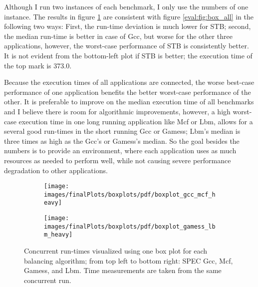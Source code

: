 Although I run two instances of each benchmark, I only use the numbers of one
instance.
The results in figure \ref{eval:fig:box_heavy} are consistent with figure
\ref{eval:fig:box_all} in the following two ways:
First, the run-time deviation is much lower for STB; second, the median
run-time is better in case of Gcc, but worse for the other three applications,
however, the worst-case performance of STB is consistently better.
It is not evident from the bottom-left plot if STB is better; the
execution time of the top mark is 373.0.

Because the execution times of all applications are connected, the worse
best-case performance of one application benefits the better worst-case
performance of the other.
It is preferable to improve on the median execution time of all benchmarks and
I believe there is room for algorithmic improvements, however, a high
worst-case execution time in one long running application like Mcf or Lbm, allows for a
several good run-times in the short running Gcc or Gamess; Lbm's median is
three times as high as the Gcc's or Gamess's median.
So the goal besides the numbers is to provide an environment, where each
application uses as much resources as needed to perform well, while not causing
severe performance degradation to other applications.
%
\begin{figure}[h!]
  \begin{subfigure}{\textwidth}
  \texttt{[image: images/finalPlots/boxplots/pdf/boxplot\_gcc\_mcf\_heavy]}
  \end{subfigure}
  \begin{subfigure}{\textwidth}
  \texttt{[image: images/finalPlots/boxplots/pdf/boxplot\_gamess\_lbm\_heavy]}
  \end{subfigure}
  \caption{Concurrent run-times visualized using one box plot for each balancing
    algorithm; from top left to bottom right: SPEC Gcc, Mcf, Gamess, and Lbm.
    Time measurements are taken from the same concurrent run.}
    \label{eval:fig:box_heavy}
\end{figure}

